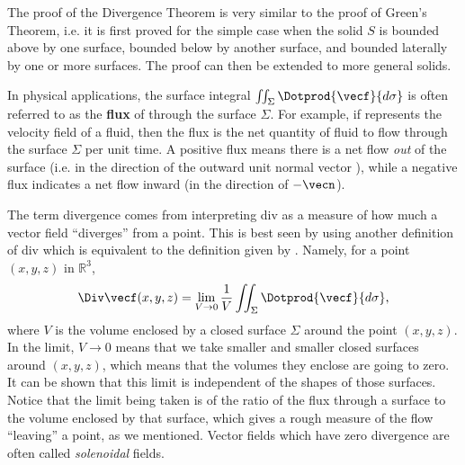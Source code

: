 The proof of the Divergence Theorem is very similar to the proof of Green's Theorem, i.e. it is first proved for the simple case when the solid $S$ is bounded above by one surface, bounded below by another surface, and bounded laterally by one or more surfaces. The proof can then be extended to more general solids.%


In physical applications, the surface integral $\iint_{\Sigma} \Dotprod{\vecf}{d\sigma}$ is often referred to as the \textbf{flux} of \vecf through the surface $\Sigma$. For example, if \vecf represents the velocity field of a fluid, then the flux is the net quantity of fluid to flow through the surface $\Sigma$ per unit time. A positive flux means there is a net flow \emph{out} of the surface (i.e. in the direction of the outward unit normal vector \vecn), while a negative flux indicates a net flow inward (in the direction of $-\vecn$).

The term divergence comes from interpreting div \vecf as a measure of how much a vector field ``diverges'' from a point. This is best seen by using another definition of div \vecf which is equivalent
to the definition given by . Namely, for a point $(x,y,z)$ in $\mathbb{R}^{3}$,
\begin{equation}\label{eqn:divalt}
 \Div\vecf(x,y,z) = \lim_{V \to 0} \frac{1}{V} \iint_{\Sigma} \Dotprod{\vecf}{d\sigma} ,
\end{equation}
where $V$ is the volume enclosed by a closed surface $\Sigma$ around the point $(x,y,z)$. In the limit, $V \to 0$ means that we take smaller and smaller closed surfaces around $(x,y,z)$, which means that the volumes they enclose are going to zero. It can be shown that this limit is independent of the shapes of those surfaces. Notice that the limit being taken is of the ratio of the flux through a surface to the volume enclosed by that surface, which gives a rough measure of the flow ``leaving'' a point, as we mentioned. Vector fields which have zero divergence are often called \emph{solenoidal} fields.


